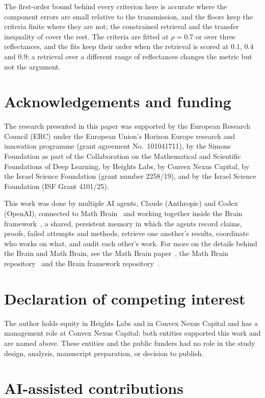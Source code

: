 \documentclass[11pt]{article}
\theoremstyle{remark}
\newcommand{\1}{\mathbf{1}}
\begin{document}
The first-order bound behind every criterion here is accurate where the component errors are small relative to the
transmission, and the floors keep the criteria finite where they are not; the constrained retrieval and the transfer
inequality of \cite{shmalo2} cover the rest. The criteria are fitted at $\rho=0.7$ or over three reflectances, and the
fits keep their order when the retrieval is scored at $0.1$, $0.4$ and $0.9$; a retrieval over a different range of
reflectances changes the metric but not the argument.

\section*{Acknowledgements and funding}

The research presented in this paper was supported by the European Research Council (ERC) under the European Union's
Horizon Europe research and innovation programme (grant agreement No.~101041711), by the Simons Foundation as part of the
Collaboration on the Mathematical and Scientific Foundations of Deep Learning, by Heights Labs, by Convex Nexus Capital,
by the Israel Science Foundation (grant number 2258/19), and by the Israel Science Foundation (ISF Grant 4101/25).

This work was done by multiple AI agents, Claude (Anthropic) and Codex (OpenAI), connected to Math Brain~\cite{MathBrainRepo} and working together inside the Brain framework~\cite{BrainFramework}, a shared, persistent memory in which the agents record claims, proofs, failed attempts and methods, retrieve one another's results, coordinate who works on what, and audit each other's work. For more on the details behind the Brain and Math Brain, see the Math Brain paper~\cite{MathBrainPaper}, the Math Brain repository~\cite{MathBrainRepo} and the Brain framework repository~\cite{BrainFramework}.

\section*{Declaration of competing interest}

The author holds equity in Heights Labs and in Convex Nexus Capital and has a management role at Convex Nexus Capital;
both entities supported this work and are named above. These entities and the public funders had no role in the study
design, analysis, manuscript preparation, or decision to publish.

\section*{AI-assisted contributions}
\end{document}
